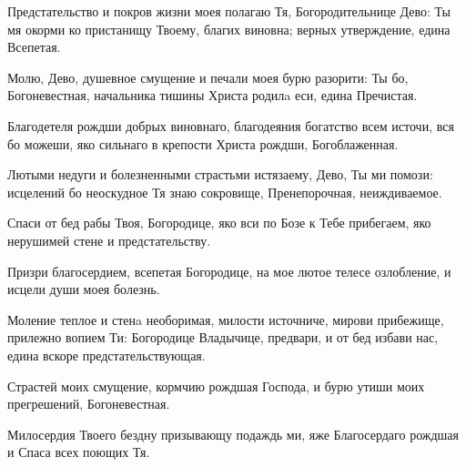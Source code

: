 \begin{mymulticols}



Предстательство и покров жизни моея полагаю Тя, Богородительнице Дево: Ты мя окорми ко пристанищу Твоему, благих виновна; верных утверждение, едина Всепетая.


Молю, Дево, душевное смущение и печали моея бурю разорити: Ты бо, Богоневестная, начальника тишины Христа родилa еси, едина Пречистая.

\slava

Благодетеля рождши добрых виновнаго, благодеяния богатство всем источи, вся бо можеши, яко сильнаго в крепости Христа рождши, Богоблаженная.

\inyne

Лютыми недуги и болезненными страстьми истязаему, Дево, Ты ми помози: исцелений бо неоскудное Тя знаю сокровище, Пренепорочная, неиждиваемое.

Спаси от бед рабы Твоя, Богородице, яко вси по Бозе к Тебе прибегаем, яко нерушимей стене и предстательству.

Призри благосердием, всепетая Богородице, на мое лютое телесе озлобление, и исцели души моея болезнь.


Моление теплое и стенa необоримая, милости источниче, мирови прибежище, прилежно вопием Ти: Богородице Владычице, предвари, и от бед избави нас, едина вскоре предстательствующая.




Страстей моих смущение, кормчию рождшая Господа, и бурю утиши моих прегрешений, Богоневестная.


Милосердия Твоего бездну призывающу подаждь ми, яже Благосердаго рождшая и Спаса всех поющих Тя.



\end{mymulticols}
